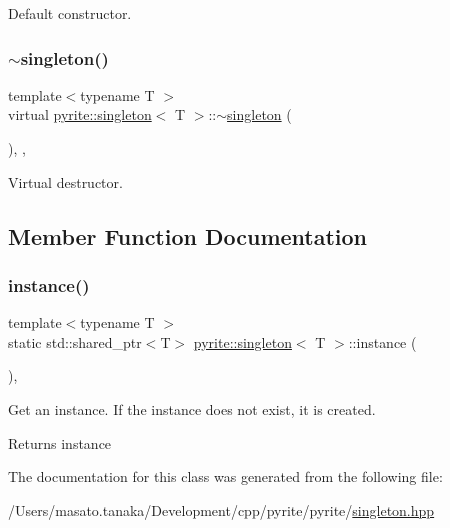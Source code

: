 Default constructor. \mbox{\label{classpyrite_1_1singleton_a7255eef299d5121b3a57d4c808776847}} 
\subsubsection{\texorpdfstring{$\sim$singleton()}{~singleton()}}
{\footnotesize\ttfamily template$<$typename T $>$ \\
virtual \mbox{\hyperlink{classpyrite_1_1singleton}{pyrite\+::singleton}}$<$ T $>$\+::$\sim$\mbox{\hyperlink{classpyrite_1_1singleton}{singleton}} (\begin{DoxyParamCaption}{ }\end{DoxyParamCaption})\hspace{0.3cm}{\ttfamily [protected]}, {\ttfamily [virtual]}, {\ttfamily [default]}}

Virtual destructor. 

\subsection{Member Function Documentation}
\mbox{\label{classpyrite_1_1singleton_a60ded278bfa70dcd8d0099ce3016ca40}} 
\subsubsection{\texorpdfstring{instance()}{instance()}}
{\footnotesize\ttfamily template$<$typename T $>$ \\
static std\+::shared\+\_\+ptr$<$T$>$ \mbox{\hyperlink{classpyrite_1_1singleton}{pyrite\+::singleton}}$<$ T $>$\+::instance (\begin{DoxyParamCaption}{ }\end{DoxyParamCaption})\hspace{0.3cm}{\ttfamily [inline]}, {\ttfamily [static]}}

Get an instance. If the instance does not exist, it is created. \begin{DoxyReturn}{Returns}
instance 
\end{DoxyReturn}


The documentation for this class was generated from the following file\+:\begin{DoxyCompactItemize}
\item 
/\+Users/masato.\+tanaka/\+Development/cpp/pyrite/pyrite/\mbox{\hyperlink{singleton_8hpp}{singleton.\+hpp}}\end{DoxyCompactItemize}
